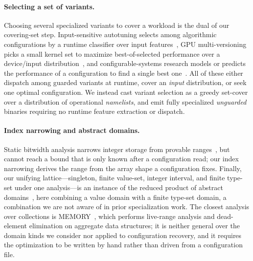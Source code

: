 \paragraph{Selecting a set of variants.}
Choosing several specialized variants to cover a workload is the dual of our covering-set step. Input-sensitive autotuning selects among algorithmic configurations by a runtime classifier over input features~\cite{petabricks_inputaware}, GPU multi-versioning picks a small kernel set to maximize best-of-selected performance over a device/input distribution~\cite{hochgrafpai,lawson_sycl}, and configurable-systems research models or predicts the performance of a configuration to find a single best one~\cite{siegmund_fse15}. All of these either dispatch among guarded variants at runtime, cover an \emph{input} distribution, or seek one optimal configuration. We instead cast variant selection as a greedy set-cover over a distribution of operational \emph{namelists}, and emit fully specialized \emph{unguarded} binaries requiring no runtime feature extraction or dispatch.

\paragraph{Index narrowing and abstract domains.}
Static bitwidth analysis narrows integer storage from provable ranges~\cite{bitwise}, but cannot reach a bound that is only known after a configuration read; our index narrowing derives the range from the array shape a configuration fixes. Finally, our unifying lattice---singleton, finite value-set, integer interval, and finite type-set under one analysis---is an instance of the reduced product of abstract domains~\cite{reducedproduct}, here combining a value domain with a finite type-set domain, a combination we are not aware of in prior specialization work. The closest analysis over collections is MEMORY~\cite{memory_cgo24}, which performs live-range analysis and dead-element elimination on aggregate data structures; it is neither general over the domain kinds we consider nor applied to configuration recovery, and it requires the optimization to be written by hand rather than driven from a configuration file.
